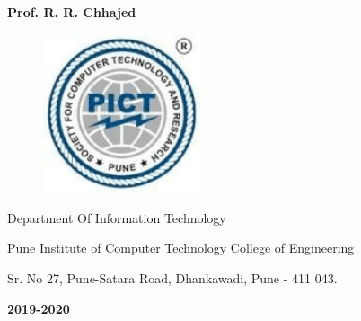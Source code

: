 ﻿\documentclass[a4paper, 12pt]{article}
\begin{document}
\begin{titlepage}
\begin{center}
{\fontsize{16pt}{19.2pt}\selectfont \textbf{\textcolor[HTML]{FF0000}{\Large Prof. R. R. Chhajed}}\par}
\end{center}
\vspace{\baselineskip}
\begin{figure}[H]
    \centering
		\includegraphics[width=1.84in,height=1.84in]{Pict_logo.png}
\end{figure}
\begin{center}
{\large Department Of Information Technology}
\end{center}

\begin{center}
{\Large Pune Institute of Computer Technology College of Engineering}
\end{center}

\begin{center}
Sr. No 27, Pune-Satara Road, Dhankawadi, Pune - 411 043.\textbf{ }
\end{center}

\begin{center}
\textbf{{\Large 2019-2020}}
\end{center}
\end{titlepage}
\pagebreak
\end{document}
